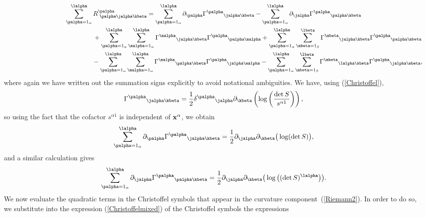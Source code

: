\begin{gather}
\sum_{\palpha=1_{\alpha}}^{\lalpha}R^{\palpha}_{{\phantom l} \palpha \jalpha \kbeta} =\sum_{\palpha=1_{\alpha}}^{\lalpha}\partial_{\palpha}{\Gamma^{\palpha}}_{\jalpha \kbeta}-\sum_{\palpha=1_{\alpha}}^{\lalpha}\partial_{\jalpha}{\Gamma^{\palpha}}_{\palpha \kbeta}\nonumber\\
\hphantom{\sum_{\palpha=1_{\alpha}}^{\lalpha}R^{\palpha}_{{\phantom l} \palpha \jalpha \kbeta} =}{}
+\sum_{\palpha=1_{\alpha}}^{\lalpha}\sum_{\malpha = 1_{\alpha}}^{\lalpha}{\Gamma^{\malpha}}_{\jalpha \kbeta}{\Gamma^{\palpha}}_{\palpha \malpha}+\sum_{\palpha=1_{\alpha}}^{\lalpha}\sum_{\mbeta=1_{\beta}}^{\lbeta}{\Gamma^{\mbeta}}_{\jalpha \kbeta}{\Gamma^{\palpha}}_{\palpha \mbeta}\nonumber\\
\hphantom{\sum_{\palpha=1_{\alpha}}^{\lalpha}R^{\palpha}_{{\phantom l} \palpha \jalpha \kbeta} =}{}-\sum_{\palpha=1_{\alpha}}^{\lalpha}\sum_{\malpha=1_{\alpha}}^{\lalpha}{\Gamma^{\malpha}}_{\palpha \kbeta}{\Gamma^{\palpha}}_{\jalpha \malpha}-\sum_{\palpha=1_{\alpha}}^{\lalpha}\sum_{\mbeta=1_{\beta}}^{\lbeta}{\Gamma^{\mbeta}}_{\lalpha \kbeta}{\Gamma^{\palpha}}_{\jalpha \mbeta},\label{Riemann2}
\end{gather}
where again we have written out the summation signs explicitly to avoid notational ambiguities. We have, using (\ref{Christoffel}),
\begin{gather}\label{moreChristoffel}
{\Gamma^{\palpha}}_{\jalpha \kbeta}=\frac{1}{2}{\delta^{\palpha}}_{\jalpha}\partial_{\kbeta}\left(\log\left(\frac{\det S}{s^{\alpha 1}}\right)\right),
\end{gather}
so using the fact that the cofactor $s^{\alpha 1}$ is independent of ${\bf x}^{\alpha}$, we obtain
\begin{gather}\label{newderiv1}
\sum_{\palpha=1_{\alpha}}^{\lalpha}\partial_{\palpha}{\Gamma^{\palpha}}_{\jalpha \kbeta}=\frac{1}{2}\partial_{\jalpha}\partial_{\kbeta}\big(\log(\det S)\big),
\end{gather}
and a similar calculation gives
\begin{gather}\label{newderiv2}
\sum_{\palpha=1_{\alpha}}^{\lalpha}\partial_{\jalpha}{\Gamma^{\palpha}}_{\palpha \kbeta}=\frac{1}{2}\partial_{\jalpha}\partial_{\kbeta}\big(\log\big((\det S)^{\lalpha}\big)\big).
\end{gather}
We now evaluate the quadratic terms in the Christoffel symbols that appear in the curvature component~(\ref{Riemann2}). In order to do so, we substitute into the expression (\ref{Christoffelmixed}) of the Christoffel symbols the expressions
